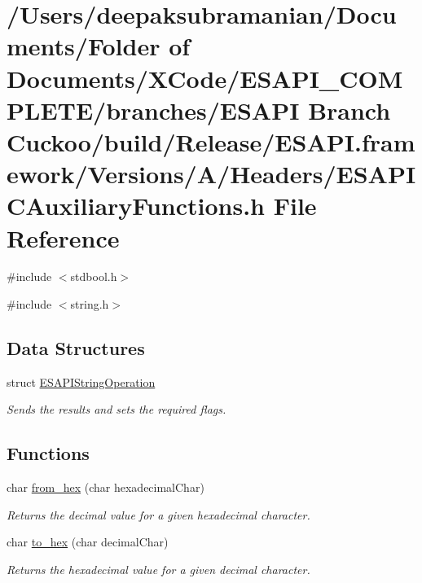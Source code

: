 \hypertarget{a00004}{
\section{/Users/deepaksubramanian/Documents/Folder of Documents/XCode/ESAPI\_\-COMPLETE/branches/ESAPI Branch Cuckoo/build/Release/ESAPI.framework/Versions/A/Headers/ESAPICAuxiliaryFunctions.h File Reference}
\label{d0/d0b/a00004}
}
{\ttfamily \#include $<$stdbool.h$>$}\par
{\ttfamily \#include $<$string.h$>$}\par
\subsection*{Data Structures}
\begin{DoxyCompactItemize}
\item 
struct \hyperlink{a00002}{ESAPIStringOperation}
\begin{DoxyCompactList}\small\item\em Sends the results and sets the required flags. \end{DoxyCompactList}\end{DoxyCompactItemize}
\subsection*{Functions}
\begin{DoxyCompactItemize}
\item 
char \hyperlink{a00004_add5c1df19752ca8972a0ad9271044105}{from\_\-hex} (char hexadecimalChar)
\begin{DoxyCompactList}\small\item\em Returns the decimal value for a given hexadecimal character. \end{DoxyCompactList}\item 
char \hyperlink{a00004_a95b5f7a5b7b116ffbe9a4a439ad167dc}{to\_\-hex} (char decimalChar)
\begin{DoxyCompactList}\small\item\em Returns the hexadecimal value for a given decimal character. \end{DoxyCompactList}\end{DoxyCompactItemize}


